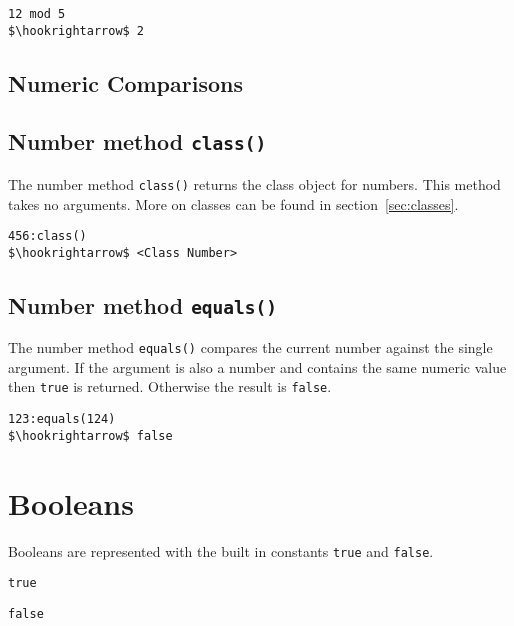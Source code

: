 \documentclass[11pt,a4paper]{scrbook}
\begin{document}
\begin{lstlisting}[language=BibTool,mathescape=true]
12 mod 5
$\hookrightarrow$ 2
\end{lstlisting}

\subsection{Numeric Comparisons}


\subsection{Number method \texttt{class()}}

The number method \texttt{class()} returns the class object for numbers. This
method takes no arguments. More on classes can be found in
section~\ref{sec:classes}.

\begin{lstlisting}[language=BibTool,mathescape=true]
456:class()
$\hookrightarrow$ <Class Number>
\end{lstlisting}

\subsection{Number method \texttt{equals()}}

The number method \texttt{equals()} compares the current number against the
single argument. If the argument is also a number and contains the same
numeric value then \verb|true| is returned. Otherwise the result is
\verb|false|.

\begin{lstlisting}[language=BibTool,mathescape=true]
123:equals(124)
$\hookrightarrow$ false
\end{lstlisting}



\section{Booleans}

Booleans are represented with the built in constants \verb|true| and
\verb|false|.

\begin{lstlisting}[language=BibTool]
true
\end{lstlisting}

\begin{lstlisting}[language=BibTool]
false
\end{lstlisting}
\end{document}
